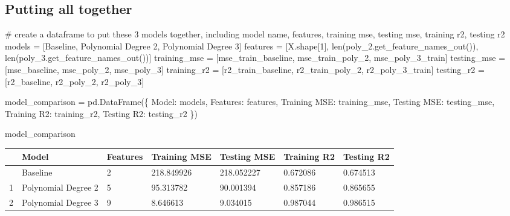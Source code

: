 \documentclass[
  letterpaper,
  DIV=11,
  numbers=noendperiod]{scrreprt}
\newenvironment{Shaded}{\begin{snugshade}}{\end{snugshade}}
\newcommand{\BuiltInTok}[1]{\textcolor[rgb]{0.00,0.23,0.31}{#1}}
\newcommand{\CommentTok}[1]{\textcolor[rgb]{0.37,0.37,0.37}{#1}}
\newcommand{\DecValTok}[1]{\textcolor[rgb]{0.68,0.00,0.00}{#1}}
\newcommand{\NormalTok}[1]{\textcolor[rgb]{0.00,0.23,0.31}{#1}}
\newcommand{\OperatorTok}[1]{\textcolor[rgb]{0.37,0.37,0.37}{#1}}
\newcommand{\StringTok}[1]{\textcolor[rgb]{0.13,0.47,0.30}{#1}}
\begin{document}
\subsection{Putting all together}\label{putting-all-together}

\begin{Shaded}
\begin{Highlighting}[]
\CommentTok{\# create a dataframe to put these 3 models together, including model name, features, training mse, testing mse, training r2, testing r2}
\NormalTok{models }\OperatorTok{=}\NormalTok{ [}\StringTok{\textquotesingle{}Baseline\textquotesingle{}}\NormalTok{, }\StringTok{\textquotesingle{}Polynomial Degree 2\textquotesingle{}}\NormalTok{, }\StringTok{\textquotesingle{}Polynomial Degree 3\textquotesingle{}}\NormalTok{]}
\NormalTok{features }\OperatorTok{=}\NormalTok{ [X.shape[}\DecValTok{1}\NormalTok{], }\BuiltInTok{len}\NormalTok{(poly\_2.get\_feature\_names\_out()), }\BuiltInTok{len}\NormalTok{(poly\_3.get\_feature\_names\_out())]}
\NormalTok{training\_mse }\OperatorTok{=}\NormalTok{ [mse\_train\_baseline, mse\_train\_poly\_2, mse\_poly\_3\_train]}
\NormalTok{testing\_mse }\OperatorTok{=}\NormalTok{ [mse\_baseline, mse\_poly\_2, mse\_poly\_3]}
\NormalTok{training\_r2 }\OperatorTok{=}\NormalTok{ [r2\_train\_baseline, r2\_train\_poly\_2, r2\_poly\_3\_train]}
\NormalTok{testing\_r2 }\OperatorTok{=}\NormalTok{ [r2\_baseline, r2\_poly\_2, r2\_poly\_3]}

\NormalTok{model\_comparison }\OperatorTok{=}\NormalTok{ pd.DataFrame(\{   }
    \StringTok{\textquotesingle{}Model\textquotesingle{}}\NormalTok{: models,}
    \StringTok{\textquotesingle{}Features\textquotesingle{}}\NormalTok{: features,}
    \StringTok{\textquotesingle{}Training MSE\textquotesingle{}}\NormalTok{: training\_mse,}
    \StringTok{\textquotesingle{}Testing MSE\textquotesingle{}}\NormalTok{: testing\_mse,}
    \StringTok{\textquotesingle{}Training R2\textquotesingle{}}\NormalTok{: training\_r2,}
    \StringTok{\textquotesingle{}Testing R2\textquotesingle{}}\NormalTok{: testing\_r2}
\NormalTok{\})}

\NormalTok{model\_comparison}
\end{Highlighting}
\end{Shaded}

\begin{longtable}[]{@{}lllllll@{}}
\toprule\noalign{}
& Model & Features & Training MSE & Testing MSE & Training R2 & Testing
R2 \\
\midrule\noalign{}
\endhead
\bottomrule\noalign{}
\endlastfoot
0 & Baseline & 2 & 218.849926 & 218.052227 & 0.672086 & 0.674513 \\
1 & Polynomial Degree 2 & 5 & 95.313782 & 90.001394 & 0.857186 &
0.865655 \\
2 & Polynomial Degree 3 & 9 & 8.646613 & 9.034015 & 0.987044 &
0.986515 \\
\end{longtable}
\end{document}
